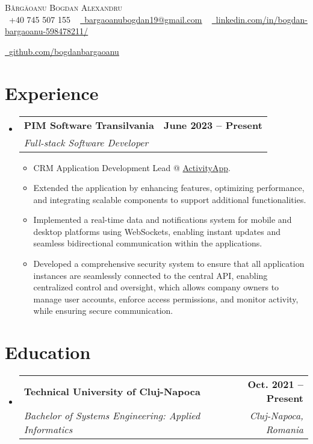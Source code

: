 \documentclass[letterpaper,11pt]{article}
\makeatletter
\newcommand{\resumeItem}[1]{
  \item\small{
    {#1 \vspace{-2pt}}
  }
}
\newcommand{\resumeSubheading}[4]{
  \vspace{-2pt}\item
    \begin{tabular*}{1.0\textwidth}[t]{l@{\extracolsep{\fill}}r}
      \textbf{#1} & \textbf{\small #2} \\
      \textit{\small#3} & \textit{\small #4} \\
    \end{tabular*}\vspace{-7pt}
}
\newcommand{\resumeSubHeadingListStart}{\begin{itemize}[leftmargin=0.0in, label={}]}
\newcommand{\resumeSubHeadingListEnd}{\end{itemize}}
\newcommand{\resumeItemListStart}{\begin{itemize}}
\newcommand{\resumeItemListEnd}{\end{itemize}\vspace{-5pt}}
\makeatother
\begin{document}
\begin{center}
    {\Huge \scshape Bârgăoanu Bogdan Alexandru} \\ \vspace{1pt}
    \small \raisebox{-0.1\height}\faPhone\ +40 745 507 155 ~ 
    \href{mailto:x@gmail.com}{\raisebox{-0.2\height}\faEnvelope\  \underline{bargaoanubogdan19@gmail.com}} ~ 
    \href{https://linkedin.com/in//}{\raisebox{-0.2\height}\faLinkedin\ \underline{linkedin.com/in/bogdan-bargaoanu-598478211/}}  ~
    
    \href{https://github.com/}{\raisebox{-0.2\height}\faGithub\ \underline{github.com/bogdanbargaoanu}}
    \vspace{-8pt}
\end{center}
\section{Experience}
  \resumeSubHeadingListStart
   \resumeSubheading
      {PIM Software Transilvania}{June 2023 -- Present}
      {Full-stack Software Developer}{}
      \resumeItemListStart
        \resumeItem{CRM Application Development Lead @ \href{https://pimsoftware.ro/activityapp/}{ActivityApp}.}
        \resumeItem{Extended the application by enhancing features, optimizing performance, and integrating scalable components to support additional functionalities.}
        \resumeItem{ Implemented a real-time data and notifications system for mobile and desktop platforms using WebSockets, enabling instant updates and seamless bidirectional communication within the applications.}
        \resumeItem{ Developed a comprehensive security system to ensure that all application instances are seamlessly connected to the central API, enabling centralized control and oversight, which allows company owners to manage user accounts, enforce access permissions, and monitor activity, while ensuring secure communication.}
      \resumeItemListEnd
  \resumeSubHeadingListEnd
\vspace{-16pt}

\section{Education}
  \resumeSubHeadingListStart
    \resumeSubheading
      {Technical University of Cluj-Napoca}{Oct. 2021 -- Present}
      {Bachelor of Systems Engineering: Applied Informatics}{Cluj-Napoca, Romania}
  \resumeSubHeadingListEnd
  
\end{document}
